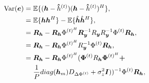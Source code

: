 \documentclass[journal]{IEEEtran}
\begin{document}
\begin{equation}
\begin{split}
\text{Var}(\boldsymbol{e}) = \hspace{0.3em}& \mathbb{E}\{ (\boldsymbol{h} - \boldsymbol{\hat}{h}^{(t)})(\boldsymbol{h} - \boldsymbol{\hat}{h}^{(t)})^H \}, \\
=\hspace{0.3em}& \mathbb{E}\{\boldsymbol{h} \boldsymbol{h}^H\} - \mathbb{E}\{\hat{\boldsymbol{h}}\hat{\boldsymbol{h}}^H\}, \\
=\hspace{0.3em}& \boldsymbol{R}_{\boldsymbol{h}} - \boldsymbol{R}_{\boldsymbol{h}}\Phi^{(t)^H}\boldsymbol{R}_{\boldsymbol{y}}^{-1}R_{\boldsymbol{y}}R_{\boldsymbol{y}}^{-1}\Phi^{(t)}\boldsymbol{R}_{\boldsymbol{h}}, \\
=\hspace{0.3em}& \boldsymbol{R}_{\boldsymbol{h}} - \boldsymbol{R}_{\boldsymbol{h}}\Phi^{(t)^H}R_{\boldsymbol{y}}^{-1}\Phi^{(t)}\boldsymbol{R}_{\boldsymbol{h}}, \\
=\hspace{0.3em}& \boldsymbol{R}_{\boldsymbol{h}} - \boldsymbol{R}_{\boldsymbol{h}}\Phi^{(t)^H} (\boldsymbol{\Phi}^{(t)} R_{\boldsymbol{h}} \boldsymbol{\Phi}^{(t)^{H}}\boldsymbol{+} \\
\hspace{0.3em}& \frac{1}{P} diag(\boldsymbol{h}_m) D_{\Delta \Phi^{(t)}} +\sigma_z^2\boldsymbol{I}))^{-1} \Phi^{(t)}\boldsymbol{R}_{\boldsymbol{h}}, \\
\end{split}
\end{equation}




{\renewcommand{\baselinestretch}{1.1}
\begin{footnotesize}


\end{footnotesize}}
\end{document}
